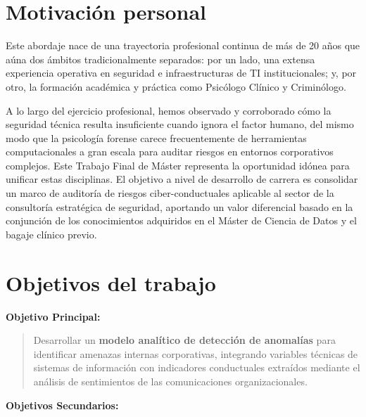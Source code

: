 \documentclass[IB]{TFUOC}%
\begin{document}
\section{Motivación personal}
Este abordaje nace de una trayectoria profesional continua de más de 20 años que aúna dos ámbitos tradicionalmente separados: por un lado, una extensa experiencia operativa en seguridad e infraestructuras de TI institucionales; y, por otro, la formación académica y práctica como Psicólogo Clínico y Criminólogo. 

\medskip
\noindent A lo largo del ejercicio profesional, hemos observado y corroborado cómo la seguridad técnica resulta insuficiente cuando ignora el factor humano, del mismo modo que la psicología forense carece frecuentemente de herramientas computacionales a gran escala para auditar riesgos en entornos corporativos complejos. Este Trabajo Final de Máster representa la oportunidad idónea para unificar estas disciplinas. El objetivo a nivel de desarrollo de carrera es consolidar un marco de auditoría de riesgos ciber-conductuales aplicable al sector de la consultoría estratégica de seguridad, aportando un valor diferencial basado en la conjunción de los conocimientos adquiridos en el Máster de Ciencia de Datos y el bagaje clínico previo.


\section{Objetivos del trabajo}

\textbf{Objetivo Principal:} 

\begin{quote}
Desarrollar un \textbf{modelo analítico de detección de anomalías} para identificar amenazas internas corporativas, integrando variables técnicas de sistemas de información con indicadores conductuales extraídos mediante el análisis de sentimientos de las comunicaciones organizacionales.
\end{quote}


\textbf{Objetivos Secundarios:}
\end{document}
